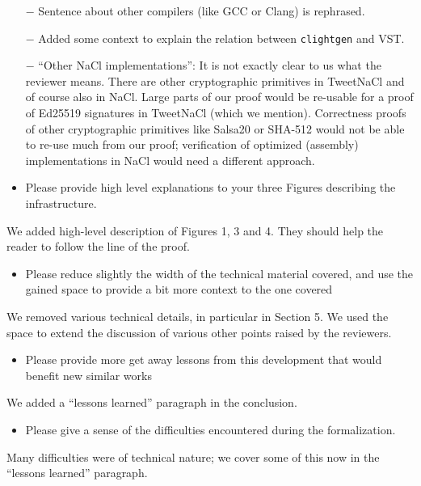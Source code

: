 \begin{answer}
  \begin{itemize}
    \item[$-$] Sentence about other compilers (like GCC or Clang) is rephrased.
    \item[$-$] Added some context to explain the relation between \texttt{clightgen} and VST.
    \item[$-$] ``Other NaCl implementations'': It is not exactly clear to us what the reviewer means. 
      There are other cryptographic primitives in TweetNaCl and of course also in NaCl. 
      Large parts of our proof would be re-usable for a proof of Ed25519 signatures in
      TweetNaCl (which we mention). Correctness proofs of other cryptographic primitives like
      Salsa20 or SHA-512 would not be able to re-use much from our proof; verification
      of optimized (assembly) implementations in NaCl would need a different approach.
  \end{itemize}
\end{answer}

\begin{center}
\end{center}
\begin{itemize}
  \item Please provide high level explanations to your three Figures describing the infrastructure.
\end{itemize}
\begin{answer}
  We added high-level description of Figures 1, 3 and 4. They should help the reader to follow the line of the proof.
\end{answer}
\begin{itemize}
  \item Please reduce slightly the width of the technical material covered, and use the gained space to provide a bit more context to the one covered
\end{itemize}
\begin{answer}
  We removed various technical details, in particular in Section 5. We used the space to extend the discussion
  of various other points raised by the reviewers.
\end{answer}
\begin{itemize}
  \item Please provide more get away lessons from this development that would benefit new similar works
\end{itemize}
\begin{answer}
  We added a ``lessons learned'' paragraph in the conclusion.
\end{answer}
\begin{itemize}
  \item Please give a sense of the difficulties encountered during the formalization.
\end{itemize}
\begin{answer}
  Many difficulties were of technical nature; we cover some of this now in the ``lessons learned'' paragraph.
\end{answer}


